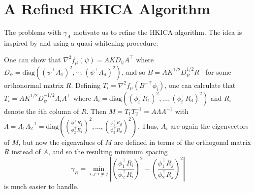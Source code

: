 \documentclass[twoside,11pt]{article}
\begin{document}
\section{A Refined HKICA Algorithm}
\label{sec:DICA}

The problems with $\gamma_A$ motivate us to refine the HKICA algorithm.
The idea is inspired by \citet{arora2012provable} and \citet{frieze1996learning} using a quasi-whitening procedure:

One can show that $\nabla^2 f_\mu(\psi)=A K D_{\psi} A^\top$ where $D_{\psi} =\text{diag}\left((\psi^{\top}A_1)^2,\cdots, (\psi^{\top}A_d)^2\right)$,
and so $B= AK^{1/2}D_{\psi}^{1/2}R^{\top}$ for some orthonormal matrix $R$. Defining $T_i=\nabla^2 f_\mu(B^{-\top} \phi_i)$, one can calculate that
$T_i=A K^{1/2} D_\psi^{-1/2} \Lambda_i A^\top$ where $\Lambda_i =\text{diag}\left( (\phi_i^\top R_1)^2,\ldots,(\phi_i^\top R_d)^2 \right)$ and $R_i$ denote the $i$th column of $R$.
Then $M=T_1 T_2^{-1} = A\Lambda A^{-1}$ with $\Lambda=\Lambda_1 \Lambda_2^{-1}=\text{diag}\left( \left(\frac{\phi_1^\top R_1}{\phi_2^\top R_1}\right)^2,\ldots,\left(\frac{\phi_1^\top R_d}{\phi_2^\top R_d}\right)^2 \right)$. Thus, $A_i$ are again the eigenvectors of $M$, but now the eigenvalues of $M$ are defined in terms of the orthogonal matrix $R$ instead of $A$,
and so the resulting minimum spacing
\vspace{-4mm}
\begin{equation}
\label{def:gammaR}
\gamma_R =  \min_{i,j: i\neq j} \left\vert \left(\frac{\phi_1^{\top}R_i}{\phi_2^{\top}R_i}\right)^2 - \left(\frac{\phi_1^{\top}R_j}{\phi_2^{\top}R_j}\right)^2 \right\vert
\end{equation}
is much easier to handle.
\end{document}
